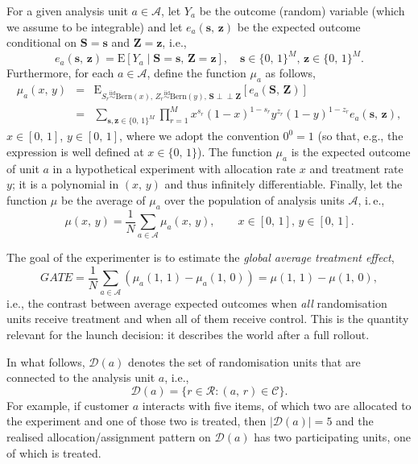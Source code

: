 \documentclass[sigconf,nonacm]{acmart}
\newcommand{\E}{\mathrm E}
\newcommand{\iidsim}{{\stackrel{\mathrm{iid}}{\sim}}}
\newcommand{\ind}{\perp\!\!\!\perp}
\begin{document}
For a given analysis unit $a\in\mathcal A$, let $Y_a$ be the outcome (random) variable (which we assume to be integrable) and let $e_a(\mathbf{s},\,\mathbf{z})$
be the expected outcome conditional on $\mathbf S = \mathbf s$ and $\mathbf Z = \mathbf z$, i.e.,
\begin{equation}\label{eq:ea}
    e_a(\mathbf{s},\,\mathbf{z}) = \E[Y_a\mid \mathbf{S} = \mathbf{s},\,\mathbf{Z}=\mathbf{z}],\quad \mathbf{s}\in \{0,\,1\}^M,\, \mathbf{z}\in \{0,\,1\}^M.
\end{equation}
Furthermore, for each $a\in\mathcal{A}$, define the function $\mu_a$ as follows,
\begin{eqnarray}\label{eq:ma}
    \mu_a(x,\,y) &=& \E_{S_r\iidsim \mathrm{Bern}(x),\,Z_r\iidsim \mathrm{Bern}(y),\,\mathbf S\ind \mathbf Z}[e_a(\mathbf S,\,\mathbf Z)]\nonumber\\
    &=& \sum_{\textbf{s},\textbf{z}\in \{0,\,1\}^M}\prod_{r=1}^Mx^{s_r}(1-x)^{1-s_r}y^{z_r}(1-y)^{1-z_r}e_a(\textbf{s},\,\textbf{z}),
\end{eqnarray}
$x\in[0,\,1]$, $y\in[0,\,1]$, where we adopt the convention $0^0=1$ (so that, e.g., the expression is well defined at $x\in\{0,\,1\}$). The function $\mu_a$ is the expected outcome of unit $a$ in a hypothetical experiment with allocation rate $x$ and treatment rate $y$; it is a polynomial in $(x,\,y)$ and thus infinitely differentiable. Finally, let the function $\mu$ be the average of $\mu_a$ over the population of analysis units $\mathcal{A}$, i.\,e.,
\begin{equation}\label{eq:mu}
    \mu(x,\,y) = \frac 1 N \sum_{a\in\mathcal{A}} \mu_a(x,\,y),\qquad x\in[0,\,1],\, y\in[0,\,1].
\end{equation}

The goal of the experimenter is to estimate the \emph{global average treatment effect},
\begin{equation}\label{eq:gate}
    GATE = \frac 1 N\sum_{a\in\mathcal A} \left(\mu_a(1,\,1) - \mu_a(1,\,0)\right) = \mu(1,\,1) - \mu(1,\,0),
\end{equation}
i.e., the contrast between average expected outcomes when \emph{all} randomisation units receive treatment and when all of them receive control. This is the quantity relevant for the launch decision: it describes the world after a full rollout.

In what follows, $\mathcal D(a)$ denotes the set of randomisation units that are connected to the analysis unit $a$, i.e.,
\begin{equation*}
    \mathcal{D}(a) = \{r\in\mathcal{R}\colon (a,\,r)\in \mathcal{C}\}.
\end{equation*}
For example, if customer $a$ interacts with five items, of which two are allocated to the experiment and one of those two is treated, then $|\mathcal D(a)|=5$ and the realised allocation/assignment pattern on $\mathcal D(a)$ has two participating units, one of which is treated.
\end{document}
